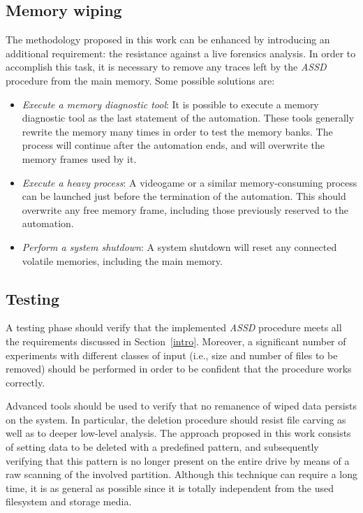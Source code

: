 \documentclass[conference]{IEEEtran}
\newcommand{\assd}{\emph{ASSD}\xspace}
\begin{document}

\subsection{Memory wiping}
The methodology proposed in this work can be enhanced by introducing an additional requirement: the resistance against a live forensics analysis. In order to accomplish this task, it is necessary to remove any traces left by the \assd procedure from the main memory. Some possible solutions are:

\begin{itemize}
 \item \textit{Execute a memory diagnostic tool}: It is possible to execute a memory diagnostic tool as the last statement of the automation. These tools generally rewrite the memory many times in order to test the memory banks. The process will continue after the automation ends, and will overwrite the memory frames used by it.
 \item \textit{Execute a heavy process}: A videogame or a similar memory-consuming process can be launched just before the termination of the automation. This should overwrite any free memory frame, including those previously reserved to the automation.
 \item \textit{Perform a system shutdown}: A system shutdown will reset any connected volatile memories, including the main memory.
\end{itemize}


\subsection{Testing}
A testing phase should verify that the implemented \assd procedure meets all the requirements discussed in Section~\ref{intro}. Moreover, a significant number of experiments with different classes of input (i.e., size and number of files to be removed) should be performed in order to be confident that the procedure works correctly.

Advanced tools should be used to verify that no remanence of wiped data persists on the system. In particular, the deletion procedure should resist file carving as well as to deeper low-level analysis. The approach proposed in this work consists of setting data to be deleted with a predefined pattern, and subsequently verifying that this pattern is no longer present on the entire drive by means of a raw scanning of the involved partition. Although this technique can require a long time, it is as general as possible since it is totally independent from the used filesystem and storage media.
\end{document}
